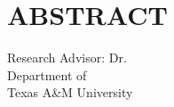 %
%
%
%

\chapter*{ABSTRACT}


\pagestyle{plain} %
\setcounter{page}{1}
\begin{center}

\begin{singlespace}
\abstracttitle
\end{singlespace}
\vspace{2em}
\vspace{2em}
\begin{singlespace}
Research Advisor: Dr. \ursadvisor \\
Department of \advisordepartment \\
Texas A\&M University \\
\end{singlespace}
\end{center}
\vspace{2em}


